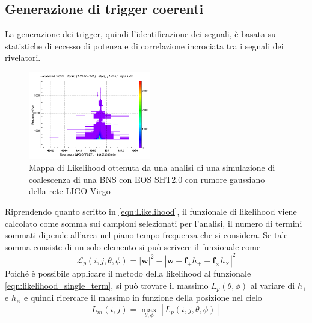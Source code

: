 \subsection{Generazione di trigger coerenti}
\label{section:coherent_trigger}

La generazione dei trigger, quindi l'identificazione dei segnali, è basata su statistiche di eccesso di potenza e di correlazione incrociata tra i segnali dei rivelatori. 

\begin{figure}
	\vspace{-27pt}
	\begin{center}
		\includegraphics[width=0.475\textwidth]{figures/Capitolo_2/l_tfmap_scalogram.png}
	\end{center}
	\vspace{-5pt}
	\caption{Mappa di Likelihood ottenuta da una analisi di una simulazione di coalescenza di una BNS con EOS SHT2.0 con rumore gaussiano della rete LIGO-Virgo}
	\label{fig:Likelihood_example}
	\vspace{-10pt}
\end{figure}
Riprendendo quanto scritto in \ref{eqn:Likelihood}, il funzionale di likelihood viene calcolato come somma sui campioni selezionati per l'analisi, il numero di termini sommati dipende all'area nel piano tempo-frequenza che si considera. Se tale somma consiste di un solo elemento si può scrivere il funzionale come
\begin{equation}
	\mathcal{L}_p(i,j,\theta,\phi)=|\mathbf{w}|^2 -|\mathbf{w} - \mathbf{f}_+h_+ - \mathbf{f}_\times h_\times|^2
	\label{eqn:likelihood_single_term}
\end{equation}
Poiché è possibile applicare il metodo della likelihood al funzionale \ref{eqn:likelihood_single_term}, si può trovare il massimo $L_p(\theta, \phi)$ al variare di $h_+$ e $h_\times$ e quindi ricercare il massimo in funzione della posizione nel cielo
\begin{equation}
	L_m(i,j)= \max_{\theta, \phi}[L_p(i,j,\theta,\phi)]
	\label{eqn:max_L}
\end{equation}
